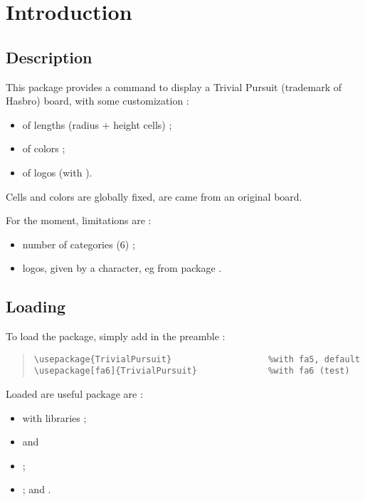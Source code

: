\documentclass[11pt,a4paper]{ltxdoc}
\begin{document}
\section{Introduction}

\subsection{Description}

This package provides a command to display a \textsf{Trivial Pursuit} (trademark of Hasbro) board, with some customization :

\begin{itemize}
	\item of lengths (radius + height cells) ;
	\item of colors ;
	\item of logos (with ).
\end{itemize}

Cells and colors are globally fixed, are came from an original board.

\medskip

For the moment, limitations are :

\begin{itemize}
	\item number of categories (6) ;
	\item logos, given by a character, eg from package .
\end{itemize}

\subsection{Loading}

To load the package, simply add in the preamble :

\begin{quote}
\begin{verbatim}
\usepackage{TrivialPursuit}                   %with fa5, default
\usepackage[fa6]{TrivialPursuit}              %with fa6 (test)
\end{verbatim}
\end{quote}

Loaded are useful package are :

\begin{itemize}
	\item {} with libraries  ;
	\item {} and \item {} ;
	\item {} ;  and .
\end{itemize}
\end{document}
